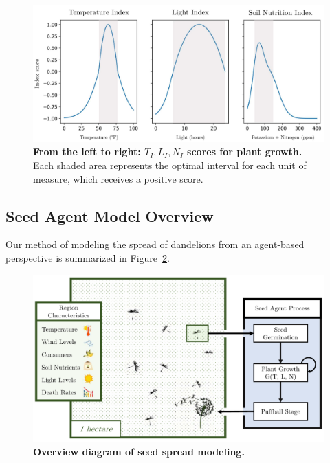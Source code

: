\begin{figure}[h!]
\centering
    \includegraphics[scale=0.5]{figures/scoreindex.pdf}
    \captionsetup{width=0.9\textwidth}
    \caption{\textbf{From the left to right: \(T_I, L_I, N_I\) scores for plant growth.} Each shaded area represents the optimal interval for each unit of measure, which receives a positive score.}
    \label{fig:indexscoregraphs}
\end{figure}

\subsection{Seed Agent Model Overview}

Our method of modeling the spread of dandelions from an agent-based perspective is summarized in Figure~\ref{fig:partadiagram}.

\begin{figure}[h!]
\centering
    \includegraphics[scale=0.82]{figures/seedspreadprocess3.pdf}
    \captionsetup{width=0.9\textwidth}
    \caption{\textbf{Overview diagram of seed spread modeling.} }
    \label{fig:partadiagram}
\end{figure}